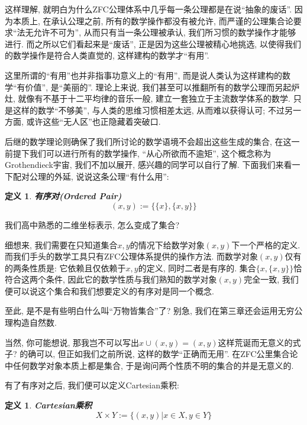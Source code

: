\documentclass[UTF8]{ctexart}
\newcommand{\<}{\langle}
\renewcommand{\>}{\rangle}
\newtheorem{dfn}[thm]{定义}
\begin{document}
            这样理解, 就明白为什么ZFC公理体系中几乎每一条公理都是在说``抽象的废话''. 因为本质上, 在承认公理之前, 所有的数学操作都没有被允许, 而严谨的公理集合论要求``法无允许不可为'', 从而只有当一条公理被承认, 我们所习惯的数学操作才能够进行. 而之所以它们看起来是``废话'', 正是因为这些公理被精心地挑选, 以使得我们的数学操作是符合人类直觉的, 这样建构的数学才``有用''. 

            这里所谓的``有用''也并非指事功意义上的``有用'', 而是说人类认为这样建构的数学``有价值'', 是``美丽的''. 理论上来说, 我们甚至可以推翻所有的数学公理而另起炉灶, 就像有不基于十二平均律的音乐一般, 建立一套独立于主流数学体系的数学. 只是这样的数学``不够美'', 与人类的思维习惯相差太远, 从而难以获得认可; 不过另一方面, 或许这些``无人区''也正隐藏着突破口. 
            
            后继的数学理论则确保了我们所讨论的数学语境不会超出这些生成的集合, 在这一前提下我们可以进行所有的数学操作, ``从心所欲而不逾矩'', 这个概念称为Grothendieck宇宙, 我们不加以展开, 感兴趣的同学可以自行了解. 下面我们来看一下配对公理的外延, 说说这条公理``有什么用'': 
            
            \begin{dfn}
                \textbf{有序对(Ordered Pair)}
                \[(x,y):=\{\{x\},\{x,y\}\}\]
            \end{dfn}

            我们高中熟悉的二维坐标表示, 怎么变成了集合? 

            细想来, 我们需要在只知道集合$x,y$的情况下给数学对象$(x,y)$下一个严格的定义. 而我们手头的数学工具只有ZFC公理体系提供的操作方法. 而数学对象$(x,y)$仅有的两条性质是: 它依赖且仅依赖于$x,y$的定义, 同时二者是有序的. 集合$\{x,\{x,y\}\}$恰符合这两个条件, 因此它的数学性质与我们熟知的数学对象$(x,y)$完全一致, 我们便可以说这个集合和我们想要定义的有序对是同一个概念. 
            
            至此, 是不是有些明白什么叫``万物皆集合''了? 别急, 我们在第三章还会运用无穷公理构造自然数. 

            当然, 你可能想说, 那我岂不可以写出$x\cup(x,y)=(x,y)$这样荒诞而无意义的式子? 的确可以, 但正如我们之前所说, 这样的数学``正确而无用''. 在ZFC公里集合论中任何数学对象本质上都是集合, 于是询问两个性质不明的集合的并是无意义的. 

            有了有序对之后, 我们便可以定义Cartesian乘积: 
            
            \begin{dfn}
                \textbf{Cartesian乘积}
                \[X\times Y:=\{(x,y)|x\in X, y\in Y\}\]
            \end{dfn}
\end{document}
